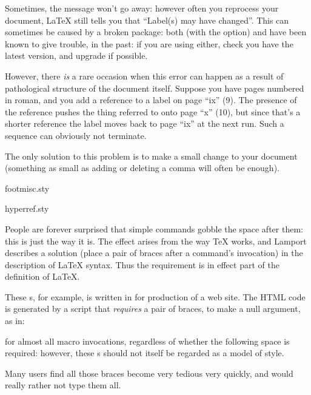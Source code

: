 Sometimes, the message won't go away: however often you reprocess your
document, \LaTeX{} still tells you that ``Label(s) may have
changed''.  This can sometimes be caused by a broken package: both
 (with the  option) and 
have been known to give trouble, in the past: if you are using either,
check you have the latest version, and upgrade if possible.

However, there \emph{is} a rare occasion when this error can happen
as a result of pathological structure of the document itself.  Suppose
you have pages numbered in roman, and you add a reference to a label
on page ``ix'' (9).  The presence of the reference pushes the thing
referred to onto page ``x'' (10), but since that's a shorter reference
the label moves back to page ``ix'' at the next run.  Such a sequence
can obviously not terminate.

The only solution to this problem is to make a small change to your
document (something as small as adding or deleting a comma will often
be enough).
\begin{ctanrefs}
\item[footmisc.sty]
\item[hyperref.sty]
\end{ctanrefs}


People are forever surprised that simple commands gobble the space
after them: this is just the way it is.  The effect arises from the
way \TeX{} works, and Lamport describes a solution (place a pair of braces
after a command's invocation) in the description of \LaTeX{} syntax.
Thus the requirement is in effect part of the definition of \LaTeX{}.

These s,
for example, is written in \latex{} for production of a web site.  The
HTML code is generated by a script that \emph{requires} a pair of
braces, to make a null argument, as in:
\begin{quote}
\end{quote}
for almost all macro invocations, regardless
of whether the following space is required: however, these s
should not itself be regarded as a model of \latex{} style.

Many users find all those braces become very tedious very
quickly, and would really rather not type them all.

